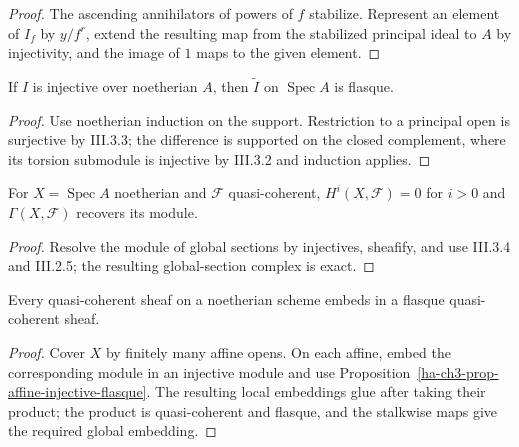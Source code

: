 \begin{proof}

The ascending annihilators of powers of $f$ stabilize.  Represent an element
of $I_f$ by $y/f^r$, extend the resulting map from the stabilized principal
ideal to $A$ by injectivity, and the image of $1$ maps to the given element.

\end{proof}
\begin{proposition}
\label{ha-ch3-prop-affine-injective-flasque}
If $I$ is injective over noetherian $A$, then $\widetilde I$ on
$\operatorname{Spec}A$ is flasque.

\end{proposition}
\begin{proof}

Use noetherian induction on the support.  Restriction to a principal open is
surjective by III.3.3; the difference is supported on the closed complement,
where its torsion submodule is injective by III.3.2 and induction applies.

\end{proof}
\begin{theorem}
\label{ha-ch3-thm-affine-vanishing}
For $X=\operatorname{Spec}A$ noetherian and $\mathcal F$ quasi-coherent,
$H^i(X,\mathcal F)=0$ for $i>0$ and $\Gamma(X,\mathcal F)$ recovers its
module.
\end{theorem}
\begin{proof}
Resolve the module of global sections by injectives, sheafify,
and use III.3.4 and III.2.5; the resulting global-section complex is exact.
\end{proof}
\begin{corollary}
\label{ha-ch3-cor-flasque-qcoh}
Every quasi-coherent sheaf on a noetherian scheme embeds in a flasque
quasi-coherent sheaf.
\end{corollary}
\begin{proof}

Cover $X$ by finitely many affine opens.  On each affine, embed the corresponding module in an
injective module and use Proposition~\ref{ha-ch3-prop-affine-injective-flasque}.  The resulting
local embeddings glue after taking their product; the product is quasi-coherent and flasque, and the
stalkwise maps give the required global embedding.

\end{proof}
